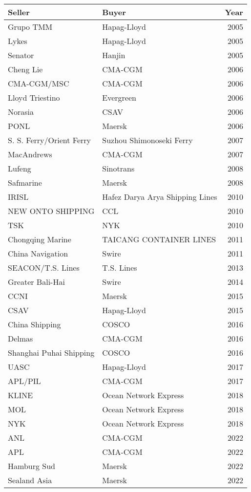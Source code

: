 
\begin{tabular}[t]{llr}
\toprule
Seller & Buyer & Year\\
\midrule
Grupo TMM & Hapag-Lloyd & 2005\\
Lykes & Hapag-Lloyd & 2005\\
Senator & Hanjin & 2005\\
Cheng Lie & CMA-CGM & 2006\\
CMA-CGM/MSC & CMA-CGM & 2006\\
Lloyd Triestino & Evergreen & 2006\\
Norasia & CSAV & 2006\\
PONL & Maersk & 2006\\
S. S. Ferry/Orient Ferry & Suzhou Shimonoseki Ferry & 2007\\
MacAndrews & CMA-CGM & 2007\\
Lufeng & Sinotrans & 2008\\
Safmarine & Maersk & 2008\\
IRISL & Hafez Darya Arya Shipping Lines & 2010\\
NEW ONTO SHIPPING & CCL & 2010\\
TSK & NYK & 2010\\
Chongqing Marine & TAICANG CONTAINER LINES & 2011\\
China Navigation & Swire & 2011\\
SEACON/T.S. Lines & T.S. Lines & 2013\\
Greater Bali-Hai & Swire & 2014\\
CCNI & Maersk & 2015\\
CSAV & Hapag-Lloyd & 2015\\
China Shipping & COSCO & 2016\\
Delmas & CMA-CGM & 2016\\
Shanghai Puhai Shipping & COSCO & 2016\\
UASC & Hapag-Lloyd & 2017\\
APL/PIL & CMA-CGM & 2017\\
KLINE & Ocean Network Express & 2018\\
MOL & Ocean Network Express & 2018\\
NYK & Ocean Network Express & 2018\\
ANL & CMA-CGM & 2022\\
APL & CMA-CGM & 2022\\
Hamburg Sud & Maersk & 2022\\
Sealand Asia & Maersk & 2022\\
\bottomrule
\end{tabular}
